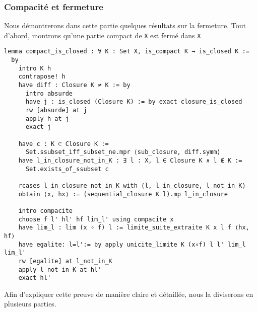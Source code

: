 \documentclass[a4paper, 12pt]{article}
\newcommand{\lean}[1]{\texttt{#1}}
\begin{document}
 \vspace{\baselineskip}

\subsubsection{Compacité et fermeture}
Nous démontrerons dans cette partie quelques résultats sur la fermeture. Tout d'abord, montrons qu'une partie compact de \lean{X} est fermé dans \lean{X}

\begin{verbatim}
lemma compact_is_closed : ∀ K : Set X, is_compact K → is_closed K :=
  by
    intro K h
    contrapose! h
    have diff : Closure K ≠ K := by
      intro absurde
      have j : is_closed (Closure K) := by exact closure_is_closed
      rw [absurde] at j
      apply h at j
      exact j

    have c : K ⊂ Closure K :=
      Set.ssubset_iff_subset_ne.mpr ⟨sub_closure, diff.symm⟩
    have l_in_closure_not_in_K : ∃ l : X, l ∈ Closure K ∧ l ∉ K :=
      Set.exists_of_ssubset c

    rcases l_in_closure_not_in_K with ⟨l, l_in_closure, l_not_in_K⟩
    obtain ⟨x, hx⟩ := (sequential_closure K l).mp l_in_closure

    intro compacite
    choose f l' hl' hf lim_l' using compacite x
    have lim_l : lim (x ∘ f) l := limite_suite_extraite K x l f ⟨hx, hf⟩
    have egalite: l=l':= by apply unicite_limite K (x∘f) l l' lim_l lim_l'
    rw [egalite] at l_not_in_K
    apply l_not_in_K at hl'
    exact hl'
\end{verbatim}

Afin d'expliquer cette preuve de manière claire et détaillée, nous la diviserons en plusieurs parties.\\
\end{document}
